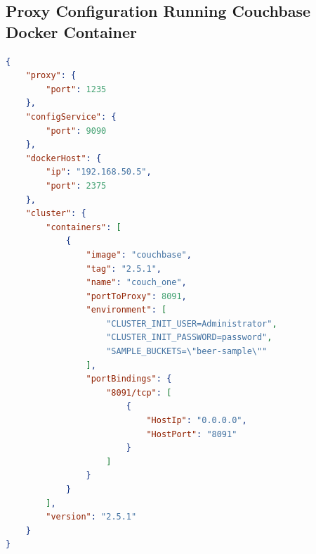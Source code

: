 \documentclass[a4paper,11pt,twoside]{report}
\begin{document}
\begin{appendices}
\section{Proxy Configuration Running Couchbase Docker Container}
\begin{lstlisting}[language=json]
{
    "proxy": {
        "port": 1235
    },
    "configService": {
        "port": 9090
    },
    "dockerHost": {
        "ip": "192.168.50.5",
        "port": 2375
    },
    "cluster": {
        "containers": [
            {
                "image": "couchbase",
                "tag": "2.5.1",
                "name": "couch_one",
                "portToProxy": 8091,
                "environment": [
                    "CLUSTER_INIT_USER=Administrator",
                    "CLUSTER_INIT_PASSWORD=password",
                    "SAMPLE_BUCKETS=\"beer-sample\""
                ],
                "portBindings": {
                    "8091/tcp": [
                        {
                            "HostIp": "0.0.0.0",
                            "HostPort": "8091"
                        }
                    ]
                }
            }
        ],
        "version": "2.5.1"
    }
}
\end{lstlisting}
\clearpage


\end{appendices}
\end{document}
